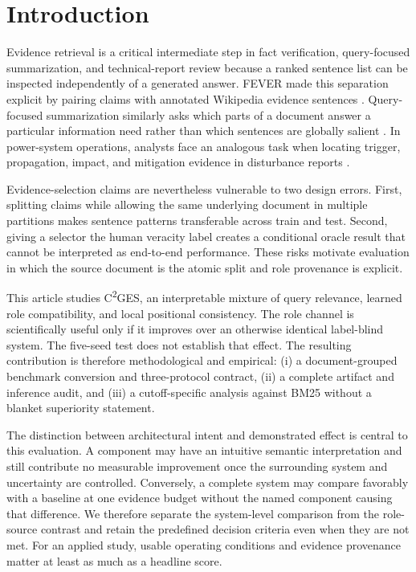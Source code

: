 \documentclass[applsci,article,submit,moreauthors]{Definitions/mdpi}
\newcommand{\cges}{C\textsuperscript{2}GES}
\begin{document}
\section{Introduction}
Evidence retrieval is a critical intermediate step in fact verification, query-focused summarization, and technical-report review because a ranked sentence list can be inspected independently of a generated answer. FEVER made this separation explicit by pairing claims with annotated Wikipedia evidence sentences \cite{thorne2018fever}. Query-focused summarization similarly asks which parts of a document answer a particular information need rather than which sentences are globally salient \cite{zhong2021qmsum,vig2022exploring,zhong2020extractive}. In power-system operations, analysts face an analogous task when locating trigger, propagation, impact, and mitigation evidence in disturbance reports \cite{xie2022massively,hamann2024foundation}.

Evidence-selection claims are nevertheless vulnerable to two design errors. First, splitting claims while allowing the same underlying document in multiple partitions makes sentence patterns transferable across train and test. Second, giving a selector the human veracity label creates a conditional oracle result that cannot be interpreted as end-to-end performance. These risks motivate evaluation in which the source document is the atomic split and role provenance is explicit.

This article studies \cges{}, an interpretable mixture of query relevance, learned role compatibility, and local positional consistency. The role channel is scientifically useful only if it improves over an otherwise identical label-blind system. The five-seed test does not establish that effect. The resulting contribution is therefore methodological and empirical: (i) a document-grouped benchmark conversion and three-protocol contract, (ii) a complete artifact and inference audit, and (iii) a cutoff-specific analysis against BM25 without a blanket superiority statement.

The distinction between architectural intent and demonstrated effect is central to this evaluation. A component may have an intuitive semantic interpretation and still contribute no measurable improvement once the surrounding system and uncertainty are controlled. Conversely, a complete system may compare favorably with a baseline at one evidence budget without the named component causing that difference. We therefore separate the system-level comparison from the role-source contrast and retain the predefined decision criteria even when they are not met. For an applied study, usable operating conditions and evidence provenance matter at least as much as a headline score.
\end{document}
